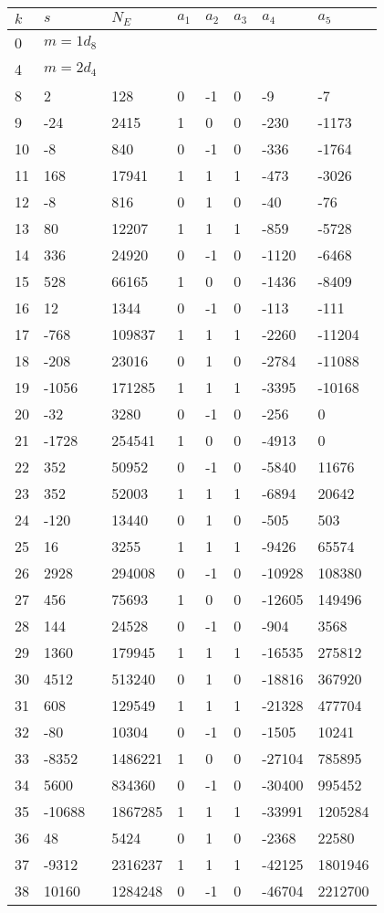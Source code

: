 \documentclass{amsart}
\begin{document}
\begin{longtable}{|l|l|l|lllll|}
\hline
$k$ & $s$ & $N_E$ & $a_1$ & $a_2$ & $a_3$ & $a_4$ & $a_5$\\
\hline
0&$m=1d_{8}$&&\multicolumn{5}{c|}{}\\
4&$m=2d_{4}$&&\multicolumn{5}{c|}{}\\
8&2&128&0&-1&0&-9&-7\\
9&-24&2415&1&0&0&-230&-1173\\
10&-8&840&0&-1&0&-336&-1764\\
11&168&17941&1&1&1&-473&-3026\\
12&-8&816&0&1&0&-40&-76\\
13&80&12207&1&1&1&-859&-5728\\
14&336&24920&0&-1&0&-1120&-6468\\
15&528&66165&1&0&0&-1436&-8409\\
16&12&1344&0&-1&0&-113&-111\\
17&-768&109837&1&1&1&-2260&-11204\\
18&-208&23016&0&1&0&-2784&-11088\\
19&-1056&171285&1&1&1&-3395&-10168\\
20&-32&3280&0&-1&0&-256&0\\
21&-1728&254541&1&0&0&-4913&0\\
22&352&50952&0&-1&0&-5840&11676\\
23&352&52003&1&1&1&-6894&20642\\
24&-120&13440&0&1&0&-505&503\\
25&16&3255&1&1&1&-9426&65574\\
26&2928&294008&0&-1&0&-10928&108380\\
27&456&75693&1&0&0&-12605&149496\\
28&144&24528&0&-1&0&-904&3568\\
29&1360&179945&1&1&1&-16535&275812\\
30&4512&513240&0&1&0&-18816&367920\\
31&608&129549&1&1&1&-21328&477704\\
32&-80&10304&0&-1&0&-1505&10241\\
33&-8352&1486221&1&0&0&-27104&785895\\
34&5600&834360&0&-1&0&-30400&995452\\
35&-10688&1867285&1&1&1&-33991&1205284\\
36&48&5424&0&1&0&-2368&22580\\
37&-9312&2316237&1&1&1&-42125&1801946\\
38&10160&1284248&0&-1&0&-46704&2212700\\

\end{longtable}
\end{document}
